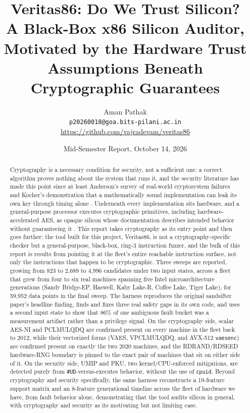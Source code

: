 \documentclass[11pt]{article}
\title{\textbf{Veritas86: Do We Trust Silicon?}\\[4pt]
\large A Black-Box x86 Silicon Auditor, Motivated by the Hardware Trust\\[2pt]
\large Assumptions Beneath Cryptographic Guarantees}
\author{Aman Pathak \\ \small \texttt{p20260018@goa.bits-pilani.ac.in} \\ \small \url{https://github.com/vajradevam/veritas86}}
\date{Mid-Semester Report, October 14, 2026}
\newcommand{\code}[1]{\texttt{#1}}
\newcommand{\project}{Veritas86}
\begin{document}
\maketitle

\begin{abstract}
Cryptography is a necessary condition for security, not a sufficient one:
a correct algorithm proves nothing about the system that runs it, and the
security literature has made this point since at least Anderson's survey
of real-world cryptosystem failures \cite{anderson1993} and Kocher's
demonstration that a mathematically sound implementation can leak its own
key through timing alone \cite{kocher1996}. Underneath every
implementation sits hardware, and a general-purpose processor executes
cryptographic primitives, including hardware-accelerated AES, as opaque
silicon whose documentation describes intended behavior without
guaranteeing it \cite{thompson1984}. This report takes cryptography as its
entry point and then goes further: the tool built for this project,
\project{}, is not a cryptography-specific checker but a general-purpose,
black-box, ring-3 instruction fuzzer, and the bulk of this report is
results from pointing it at the fleet's entire reachable instruction
surface, not only the instructions that happen to be cryptographic.
Three sweeps are reported, growing from 823 to 2{,}689 to 4{,}996
candidates under two input states, across a fleet that grew from four to
six real machines spanning five Intel microarchitecture generations
(Sandy Bridge-EP, Haswell, Kaby Lake-R, Coffee Lake, Tiger Lake), for
59{,}952 data points in the final sweep. The harness reproduces the
original sandsifter paper's headline finding, finds and fixes three real
safety gaps in its own code, and uses a second input state to show that
86\% of one ambiguous fault bucket was a measurement artifact rather than
a privilege signal. On the cryptography side, scalar AES-NI and
PCLMULQDQ are confirmed present on every machine in the fleet back to
2012, while their vectorized forms (VAES, VPCLMULQDQ, and AVX-512
\code{vaesenc}) are confirmed present on exactly the two 2020 machines,
and the RDRAND/RDSEED hardware-RNG boundary is pinned to the exact pair
of machines that sit on either side of it. On the security side, UMIP
and PKU, two kernel/CPU-enforced mitigations, are detected purely from
\code{\#UD}-versus-executes behavior, without the use of \code{cpuid}. Beyond
cryptography and security specifically, the same harness reconstructs a
19-feature support matrix and an 8-feature generational timeline across
the fleet of hardware we have, from fault behavior alone, demonstrating that the tool audits
silicon in general, with cryptography and security as its motivating but
not limiting case.
\end{abstract}
\end{document}
